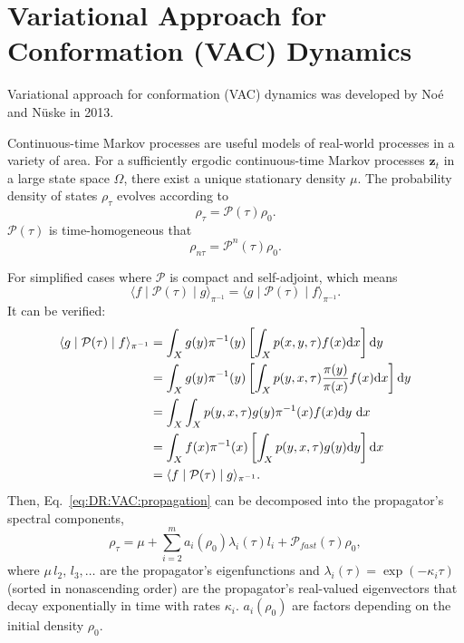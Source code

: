 \section{Variational Approach for Conformation (VAC) Dynamics\label{Sec:DR:VAC}}

Variational approach for conformation (VAC) dynamics was developed by No\'e and N\"uske in 2013.\cite{NoeMMS2013}

Continuous-time Markov processes are useful models of real-world processes in a variety of area. For a sufficiently ergodic continuous-time Markov processes $\mathbf{z}_t$ in a large state space $\Omega$, there exist a unique stationary density $\mu$. The probability density of states $\rho_{\tau}$ evolves according to
\begin{equation}
	\rho_{\tau}=\mathcal{P}(\tau)\rho_0.
	\label{eq:DR:VAC:propagation}
\end{equation}
$\mathcal{P}(\tau)$ is time-homogeneous that
\begin{equation}
	\rho_{n\tau}=\mathcal{P}^n(\tau)\rho_0.
\end{equation}

For simplified cases where $\mathcal{P}$ is compact and self-adjoint, which means
\begin{equation}
	\langle f\mid\mathcal{P}(\tau)  \mid g\rangle_{\pi^{-1}}=\langle g \mid \mathcal{P}(\tau) \mid f\rangle_{\pi^{-1}}.
\end{equation}
It can be verified:
\begin{align}
	\langle g\mid\mathcal{P}(\tau)  \mid f\rangle_{\pi^{-1}} & =\int_X g(y) \pi^{-1}(y) \left[\int_X p(x, y, \tau) f(x) \mathrm{d} x\right]  \mathrm{d} y \notag\\
	& =\int_X g(y) \pi^{-1}(y) \left[\int_X p(y, x, \tau) \frac{\pi(y)}{\pi(x)} f(x) \mathrm{d} x\right]  \mathrm{d} y \notag\\
	& =\int_X \int_X p(y, x, \tau) g(y) \pi^{-1}(x) f(x) \mathrm{d} y \mathrm{~d} x \notag\\
	& =\int_X f(x) \pi^{-1}(x)\left[\int_X p(y, x, \tau) g(y) \mathrm{d} y\right] \mathrm{d} x \notag\\
	& =\langle f \mid \mathcal{P}(\tau) \mid g\rangle_{\pi^{-1}}.
\end{align}
Then, Eq.~\ref{eq:DR:VAC:propagation} can be decomposed into the propagator's spectral components,
\begin{equation}
	\rho_{\tau}=\mu+\sum_{i=2}^m a_i(\rho_0) \lambda_i(\tau)l_i+\mathcal{P}_{fast}(\tau)\rho_0,
\end{equation}
where $\mu\, l_2,\,l_3,\dots$ are the propagator's eigenfunctions and $\lambda_i(\tau)=\exp{(-\kappa_i \tau)}$ (sorted in nonascending order) are the propagator's real-valued eigenvectors that decay exponentially in time with rates $\kappa_i$. $a_i(\rho_0)$ are factors depending on the initial density $\rho_0$. 


